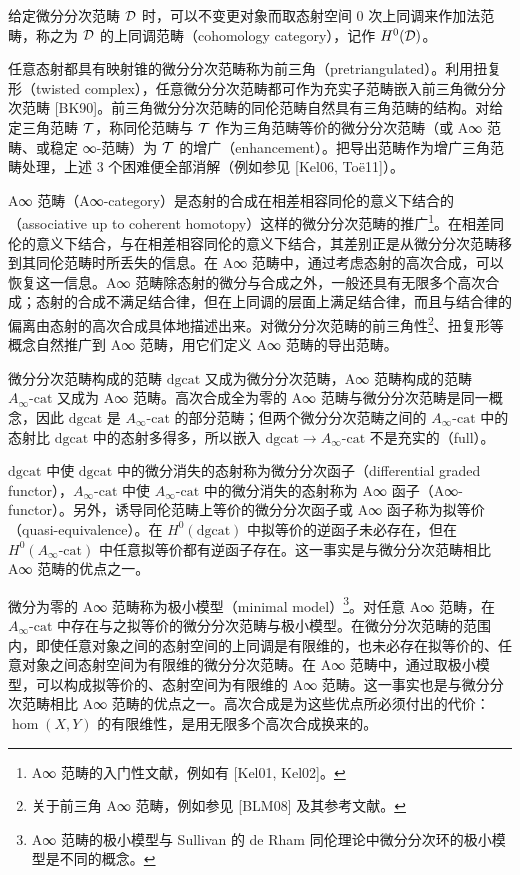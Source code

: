 
给定微分分次范畴 $\mathcal{D}$ 时，可以不变更对象而取态射空间 0 次上同调来作加法范畴，称之为 $\mathcal{D}$ 的上同调范畴（cohomology category），记作 $H^0(\mathcal{D})$。

任意态射都具有映射锥的微分分次范畴称为前三角（pretriangulated）。利用扭复形（twisted complex），任意微分分次范畴都可作为充实子范畴嵌入前三角微分分次范畴 [BK90]。前三角微分分次范畴的同伦范畴自然具有三角范畴的结构。对给定三角范畴 $\mathcal{T}$，称同伦范畴与 $\mathcal{T}$ 作为三角范畴等价的微分分次范畴（或 A∞ 范畴、或稳定 ∞-范畴）为 $\mathcal{T}$ 的增广（enhancement）。把导出范畴作为增广三角范畴处理，上述 3 个困难便全部消解（例如参见 [Kel06, Toë11]）。

A∞ 范畴（A∞-category）是态射的合成在相差相容同伦的意义下结合的（associative up to coherent homotopy）这样的微分分次范畴的推广\footnote{A∞ 范畴的入门性文献，例如有 [Kel01, Kel02]。}。在相差同伦的意义下结合，与在相差相容同伦的意义下结合，其差别正是从微分分次范畴移到其同伦范畴时所丢失的信息。在 A∞ 范畴中，通过考虑态射的高次合成，可以恢复这一信息。A∞ 范畴除态射的微分与合成之外，一般还具有无限多个高次合成；态射的合成不满足结合律，但在上同调的层面上满足结合律，而且与结合律的偏离由态射的高次合成具体地描述出来。对微分分次范畴的前三角性\footnote{关于前三角 A∞ 范畴，例如参见 [BLM08] 及其参考文献。}、扭复形等概念自然推广到 A∞ 范畴，用它们定义 A∞ 范畴的导出范畴。

微分分次范畴构成的范畴 $\mathrm{dgcat}$ 又成为微分分次范畴，A∞ 范畴构成的范畴 $A_\infty\text{-}\mathrm{cat}$ 又成为 A∞ 范畴。高次合成全为零的 A∞ 范畴与微分分次范畴是同一概念，因此 $\mathrm{dgcat}$ 是 $A_\infty\text{-}\mathrm{cat}$ 的部分范畴；但两个微分分次范畴之间的 $A_\infty\text{-}\mathrm{cat}$ 中的态射比 $\mathrm{dgcat}$ 中的态射多得多，所以嵌入 $\mathrm{dgcat}\to A_\infty\text{-}\mathrm{cat}$ 不是充实的（full）。

$\mathrm{dgcat}$ 中使 $\mathrm{dgcat}$ 中的微分消失的态射称为微分分次函子（differential graded functor），$A_\infty\text{-}\mathrm{cat}$ 中使 $A_\infty\text{-}\mathrm{cat}$ 中的微分消失的态射称为 A∞ 函子（A∞-functor）。另外，诱导同伦范畴上等价的微分分次函子或 A∞ 函子称为拟等价（quasi-equivalence）。在 $H^0(\mathrm{dgcat})$ 中拟等价的逆函子未必存在，但在 $H^0(A_\infty\text{-}\mathrm{cat})$ 中任意拟等价都有逆函子存在。这一事实是与微分分次范畴相比 A∞ 范畴的优点之一。

微分为零的 A∞ 范畴称为极小模型（minimal model）\footnote{A∞ 范畴的极小模型与 Sullivan 的 de Rham 同伦理论中微分分次环的极小模型是不同的概念。}。对任意 A∞ 范畴，在 $A_\infty\text{-}\mathrm{cat}$ 中存在与之拟等价的微分分次范畴与极小模型。在微分分次范畴的范围内，即使任意对象之间的态射空间的上同调是有限维的，也未必存在拟等价的、任意对象之间态射空间为有限维的微分分次范畴。在 A∞ 范畴中，通过取极小模型，可以构成拟等价的、态射空间为有限维的 A∞ 范畴。这一事实也是与微分分次范畴相比 A∞ 范畴的优点之一。高次合成是为这些优点所必须付出的代价：$\hom(X,Y)$ 的有限维性，是用无限多个高次合成换来的。

